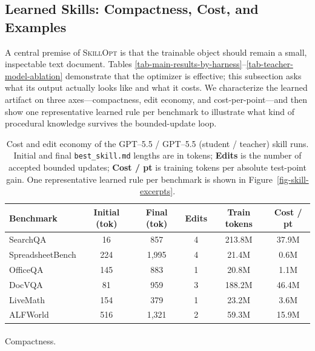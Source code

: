 \documentclass[
]{article}
\makeatletter
\let\oldparagraph\paragraph
\renewcommand{\paragraph}{
    \@ifstar
      \xxxParagraphStar
      \xxxParagraphNoStar
  }
\newcommand{\xxxParagraphStar}[1]{\oldparagraph*{#1}\mbox{}}
\newcommand{\xxxParagraphNoStar}[1]{\oldparagraph{#1}\mbox{}}
\newcommand{\ourmethod}{\textsc{SkillOpt}\xspace}
\makeatother
\begin{document}
\subsection{Learned Skills: Compactness, Cost, and
Examples}\label{sec-learned-skills}

A central premise of \ourmethod{} is that the trainable object should
remain a small, inspectable text document. Tables
\ref{tab-main-results-by-harness}--\ref{tab-teacher-model-ablation}
demonstrate that the optimizer is effective; this subsection asks what
its output actually looks like and what it costs. We characterize the
learned artifact on three axes---compactness, edit economy, and
cost-per-point---and then show one representative learned rule per
benchmark to illustrate what kind of procedural knowledge survives the
bounded-update loop.

\begin{table}[t]
\centering
\footnotesize
\setlength{\tabcolsep}{5pt}
\renewcommand{\arraystretch}{0.95}
\begin{tabular}{l c c c c c}
\toprule
\textbf{Benchmark} & \textbf{Initial (tok)} & \textbf{Final (tok)} & \textbf{Edits} & \textbf{Train tokens} & \textbf{Cost / pt} \\
\midrule
SearchQA         & 16  & 857     & 4 & 213.8M & 37.9M \\
SpreadsheetBench & 224 & 1{,}995 & 4 & 21.4M  & 0.6M  \\
OfficeQA         & 145 & 883     & 1 & 20.8M  & 1.1M  \\
DocVQA           & 81  & 959     & 3 & 188.2M & 46.4M \\
LiveMath         & 154 & 379     & 1 & 23.2M  & 3.6M  \\
ALFWorld         & 516 & 1{,}321 & 2 & 59.3M  & 15.9M \\
\bottomrule
\end{tabular}
\caption{Cost and edit economy of the GPT--5.5 / GPT--5.5 (student / teacher) skill runs. Initial and final \texttt{best\_skill.md} lengths are in tokens; \textbf{Edits} is the number of accepted bounded updates; \textbf{Cost / pt} is training tokens per absolute test-point gain. One representative learned rule per benchmark is shown in Figure~\ref{fig-skill-excerpts}.}
\label{tab-skill-cost-case}
\end{table}

\paragraph{Compactness.}\label{compactness.}
\end{document}

